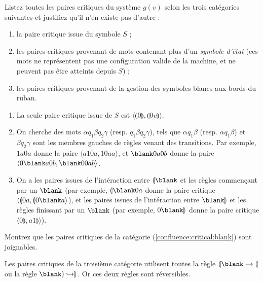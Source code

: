 \begin{exercice}
  \ifcorrection{\newpage}
  \begin{questions}
  \item Listez toutes les paires critiques du système $g(v)$ selon les trois catégories suivantes
    et justifiez qu'il n'en existe pas d'autre :
    \begin{enumerate}
    \item\label{confluence:critical:S} la paire critique issue du symbole $S$ ;
    \item\label{confluence:critical:invalid} les paires critiques provenant de mots contenant plus d'un \emph{symbole d'état}
      (ces mots ne représentent pas une configuration valide de la machine, et ne peuvent pas être atteints depuis $S$) ;
    \item\label{confluence:critical:blank} les paires critiques provenant de la gestion des symboles blancs aux bords du ruban.
    \end{enumerate}
  \end{questions}
  \begin{corrections}
    \begin{enumerate}
    \item La seule paire critique issue de $S$ est $\langle \llparenthesis 0 \rrparenthesis, \llparenthesis 0 v \rrparenthesis  \rangle$.
    \item On cherche des mots $\alpha q_1 \beta q_2 \gamma$ (resp. $q_1 \beta q_2 \gamma$), tels que $\alpha q_1 \beta$ (resp. $\alpha q_1 \beta$)
      et $\beta q_2 \gamma$ sont les membres gauches de règles venant des transitions. Par exemple, $1a0a$ donne la paire $\langle a10a, 10aa  \rangle$,
      et $\blank 0 a 0 b$ donne la paire $\langle 0 \blank a 0 b, \blank 0 0 a b \rangle$.
    \item On a les paires issues de l'intéraction entre $\llparenthesis\blank$ et les règles commençant par un $\blank$
      (par exemple, $\llparenthesis\blank 0 a$ donne la paire critique $\langle \llparenthesis 0 a, \llparenthesis 0 \blank a\rangle$),
      et les paires issues de l'intéraction entre $\blank \rrparenthesis$ et les règles finissant par un $\blank$
      (par exemple, $0 \blank \rrparenthesis$ donne la paire critique $\langle 0 \rrparenthesis, a1 \rrparenthesis\rangle$).
    \end{enumerate}
  \end{corrections}
  
  \begin{questions}
  \item Montrez que les paires critiques de la catégorie (\ref{confluence:critical:blank}) sont joignables.
  \end{questions}
  \begin{corrections}
    Les paires critiques de la troisième catégorie utilisent toutes la règle $\llparenthesis \blank \hookrightarrow \llparenthesis$
    ou la règle $\blank\rrparenthesis \hookrightarrow \rrparenthesis$. Or ces deux règles sont réversibles. 
  \end{corrections}


\end{exercice}
